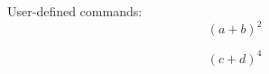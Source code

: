 \documentclass[a4paper]{article}
\newcommand{\plusbinomial} %
[3] %
[2] %
{(#2 + #3)^#1} %
\begin{document}
User-defined commands:
\[ \plusbinomial{a}{b} \]

\[ \plusbinomial[4]{c}{d} \]
\end{document}
